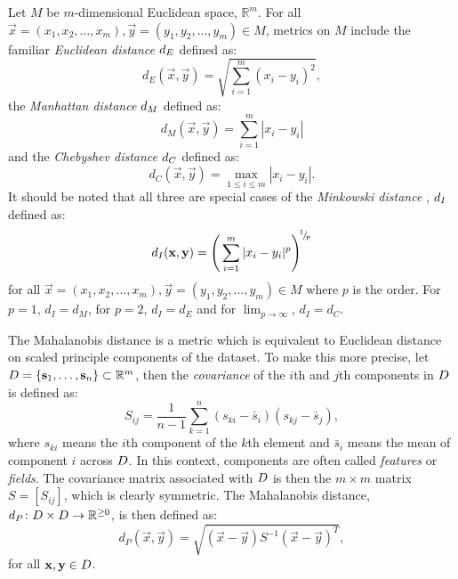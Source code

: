 Let $M$ be $m$-dimensional Euclidean space, $\mathbb{R}^m$.  For all
$\vec{x}=(x_1,x_2,\dotsc,x_m), \vec{y}=(y_1,y_2,\dotsc,y_m) \in M$, metrics on
$M$ include the familiar \textit{Euclidean distance} $d_{E}$ defined
as:
\begin{equation*}
  d_E(\vec{x},\vec{y}) = \sqrt{\sum_{i=1}^{m} (x_i - y_i)^2},
\end{equation*}
the \textit{Manhattan distance} $d_{M}$ defined as:
\begin{equation*}
  d_{M}(\vec{x},\vec{y}) = \sum_{i=1}^{m} |x_i - y_i|
\end{equation*}
and the \textit{Chebyshev distance} $d_{C}$ defined as:
\begin{equation*}
  d_C(\vec{x},\vec{y}) = \max_{1 \leq i \leq m} |x_i - y_i|.
\end{equation*}
It should be noted that all three are special cases of the \textit{Minkowski
  distance} \citep{deza2009encyclopedia}, $d_{I}$ defined as:
\begin{equation*}
  d_{I}(\mathbf{x},\mathbf{y}) = \left(\,\sum_{i=1}^{m} |x_i - y_i|^{p}\right)^{\!^1\!/\!_p}
\end{equation*}
for all $\vec{x}=(x_1,x_2,\dotsc,x_m), \vec{y}=(y_1,y_2,\dotsc,y_m) \in M$
where $p$ is the order.  For $p=1$, $d_I=d_M$, for $p=2$, $d_I=d_E$ and for
$\lim_{p \to \infty}$, $d_I=d_C$.

The Mahalanobis distance \citep{mahalanobis30distance} is a metric which is
equivalent to Euclidean distance on scaled principle components of the
dataset.  To make this more precise, let $D =
\{\mathbf{s}_1,\dotsc,\mathbf{s}_n\} \subset \mathbb{R}^m$, then the
\textit{covariance} of the $i$th and $j$th components in $D$ is defined
as:
\begin{equation*}
  S_{ij} = \frac{1}{n-1} \sum_{k=1}^{n} (s_{ki}-\bar{s}_i)(s_{kj}-\bar{s}_j),
\end{equation*}
where $s_{ki}$ means the $i$th component of the $k$th element and $\bar{s}_i$
means the mean of component $i$ across $D$.  In this context, components
are often called \textit{features} or \textit{fields}.  The covariance matrix
associated with $D$ is then the $m \times m$ matrix $S = [S_{ij}]$, which
is clearly symmetric.  The Mahalanobis distance, $d_{P} \colon D \times
D \to \mathbb{R}^{\geq 0}$, is then defined as:
\begin{equation*}
  d_{P}(\vec{x},\vec{y}) = \sqrt{(\vec{x}-\vec{y})S^{-1}(\vec{x}-\vec{y})^T},
\end{equation*}
for all $\mathbf{x},\mathbf{y} \in D$.

